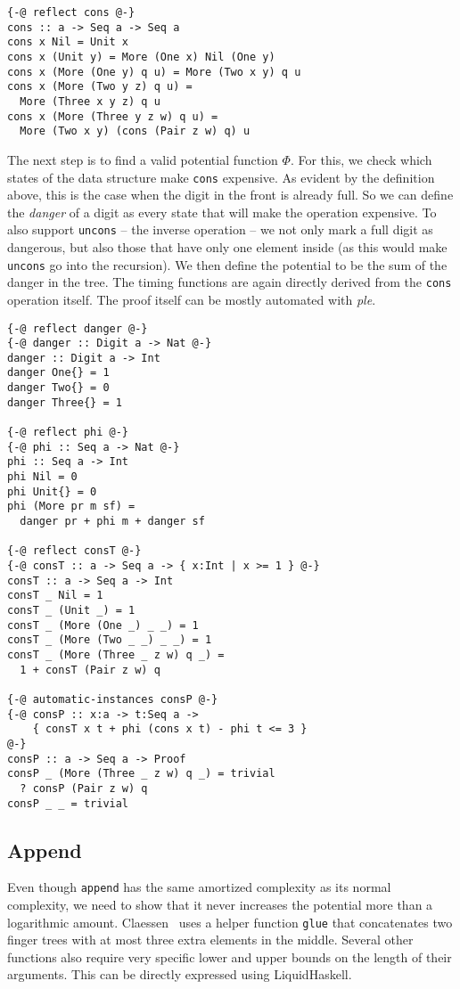 \documentclass[sigplan,screen]{acmart}
\begin{document}
\begin{lstlisting}
{-@ reflect cons @-}
cons :: a -> Seq a -> Seq a
cons x Nil = Unit x
cons x (Unit y) = More (One x) Nil (One y)
cons x (More (One y) q u) = More (Two x y) q u
cons x (More (Two y z) q u) =
  More (Three x y z) q u
cons x (More (Three y z w) q u) =
  More (Two x y) (cons (Pair z w) q) u
\end{lstlisting}

The next step is to find a valid potential function $\Phi$. For this, we check which states of the data structure make \texttt{cons} expensive. As evident by the definition above, this is the case when the digit in the front is already full. So we can define the \textit{danger} of a digit as every state that will make the operation expensive. To also support \texttt{uncons} -- the inverse operation -- we not only mark a full digit as dangerous, but also those that have only one element inside (as this would make \texttt{uncons} go into the recursion). We then define the potential to be the sum of the danger in the tree. The timing functions are again directly derived from the \texttt{cons} operation itself. The proof itself can be mostly automated with \textit{ple}.

\begin{lstlisting}
{-@ reflect danger @-}
{-@ danger :: Digit a -> Nat @-}
danger :: Digit a -> Int
danger One{} = 1
danger Two{} = 0
danger Three{} = 1

{-@ reflect phi @-}
{-@ phi :: Seq a -> Nat @-}
phi :: Seq a -> Int
phi Nil = 0
phi Unit{} = 0
phi (More pr m sf) =
  danger pr + phi m + danger sf

{-@ reflect consT @-}
{-@ consT :: a -> Seq a -> { x:Int | x >= 1 } @-}
consT :: a -> Seq a -> Int
consT _ Nil = 1
consT _ (Unit _) = 1
consT _ (More (One _) _ _) = 1
consT _ (More (Two _ _) _ _) = 1
consT _ (More (Three _ z w) q _) =
  1 + consT (Pair z w) q

{-@ automatic-instances consP @-}
{-@ consP :: x:a -> t:Seq a ->
    { consT x t + phi (cons x t) - phi t <= 3 }
@-}
consP :: a -> Seq a -> Proof
consP _ (More (Three _ z w) q _) = trivial
  ? consP (Pair z w) q
consP _ _ = trivial
\end{lstlisting}

\subsection{Append}\label{sec:append}

Even though \texttt{append} has the same amortized complexity as its normal complexity, we need to show that it never increases the potential more than a logarithmic amount. Claessen~\cite{fingertrees_new} uses a helper function \texttt{glue} that concatenates two finger trees with at most three extra elements in the middle. Several other functions also require very specific lower and upper bounds on the length of their arguments. This can be directly expressed using LiquidHaskell.
\end{document}
